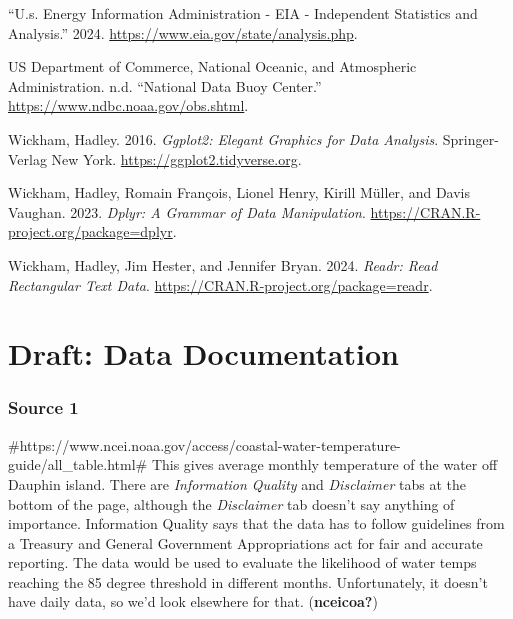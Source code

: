 \documentclass[
  letterpaper,
  DIV=11,
  numbers=noendperiod]{scrreprt}
\newlength{\cslhangindent}
\newenvironment{CSLReferences}[2] %
 {\begin{list}{}{%
  \setlength{\itemindent}{0pt}
  \setlength{\leftmargin}{0pt}
  \setlength{\parsep}{0pt}
  \ifodd #1
   \setlength{\leftmargin}{\cslhangindent}
   \setlength{\itemindent}{-1\cslhangindent}
  \fi
  \setlength{\itemsep}{#2\baselineskip}}}
 {\end{list}}
\begin{document}
\begin{CSLReferences}{1}{0}
{``U.s. Energy Information Administration - EIA - Independent Statistics
and Analysis.''} 2024. \url{https://www.eia.gov/state/analysis.php}.

US Department of Commerce, National Oceanic, and Atmospheric
Administration. n.d. {``National Data Buoy Center.''}
\url{https://www.ndbc.noaa.gov/obs.shtml}.

Wickham, Hadley. 2016. \emph{Ggplot2: Elegant Graphics for Data
Analysis}. Springer-Verlag New York.
\url{https://ggplot2.tidyverse.org}.

Wickham, Hadley, Romain François, Lionel Henry, Kirill Müller, and Davis
Vaughan. 2023. \emph{Dplyr: A Grammar of Data Manipulation}.
\url{https://CRAN.R-project.org/package=dplyr}.

Wickham, Hadley, Jim Hester, and Jennifer Bryan. 2024. \emph{Readr: Read
Rectangular Text Data}. \url{https://CRAN.R-project.org/package=readr}.

\end{CSLReferences}

\cleardoublepage
{}
{}
\appendix

\chapter{Draft: Data Documentation}\label{draft-data-documentation}

\subsection{Source 1}\label{source-1}

\#https://www.ncei.noaa.gov/access/coastal-water-temperature-guide/all\_table.html\#
This gives average monthly temperature of the water off Dauphin island.
There are \emph{Information Quality} and \emph{Disclaimer} tabs at the
bottom of the page, although the \emph{Disclaimer} tab doesn't say
anything of importance. Information Quality says that the data has to
follow guidelines from a Treasury and General Government Appropriations
act for fair and accurate reporting. The data would be used to evaluate
the likelihood of water temps reaching the 85 degree threshold in
different months. Unfortunately, it doesn't have daily data, so we'd
look elsewhere for that. (\textbf{nceicoa?})
\end{document}
